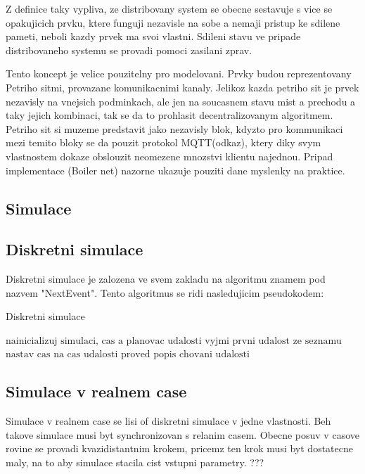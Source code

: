 Z definice taky vypliva, ze distribovany system se obecne sestavuje s vice se opakujicich prvku, ktere funguji nezavisle na sobe a nemaji pristup ke sdilene pameti, neboli kazdy prvek ma svoi vlastni. Sdileni stavu ve pripade distribovaneho systemu se provadi pomoci zasilani zprav.

Tento koncept je velice pouzitelny pro modelovani. Prvky budou reprezentovany Petriho sitmi, provazane komunikacnimi kanaly. Jelikoz kazda petriho sit je prvek nezavisly na vnejsich podminkach, ale jen na soucasnem stavu mist a prechodu a taky jejich kombinaci, tak se da to prohlasit decentralizovanym algoritmem. Petriho sit si muzeme predstavit jako nezavisly blok, kdyzto pro kommunikaci mezi temito bloky se da pouzit protokol MQTT(odkaz), ktery diky svym vlastnostem dokaze obslouzit neomezene mnozstvi klientu najednou. Pripad implementace (Boiler net) nazorne ukazuje pouziti dane myslenky na praktice.
\subsection{Simulace}
\subsection{Diskretni simulace}
Diskretni simulace je zalozena ve svem zakladu na algoritmu znamem pod nazvem "NextEvent". Tento algoritmus se ridi nasledujicim pseudokodem:
\begin{algorithm}
  \caption{Diskretni simulace}\label{euclid}
  \begin{algorithmic}[1]
  \State $\text{nainicializuj simulaci, cas a planovac udalosti}$
  \State $\text{vyjmi prvni udalost ze seznamu}$
  \Return
  \EndIf
  \State $\text{nastav cas na cas udalosti}$
  \State $\text{proved popis chovani udalosti}$
  \EndWhile
  \end{algorithmic}
  \end{algorithm}
\subsection{Simulace v realnem case}
Simulace v realnem case se lisi of diskretni simulace v jedne vlastnosti. Beh takove simulace musi byt synchronizovan s relanim casem. Obecne posuv v casove rovine se provadi kvazidistantnim krokem, pricemz ten krok musi byt dostatecne maly, na to aby simulace stacila cist vstupni parametry. ??? %

